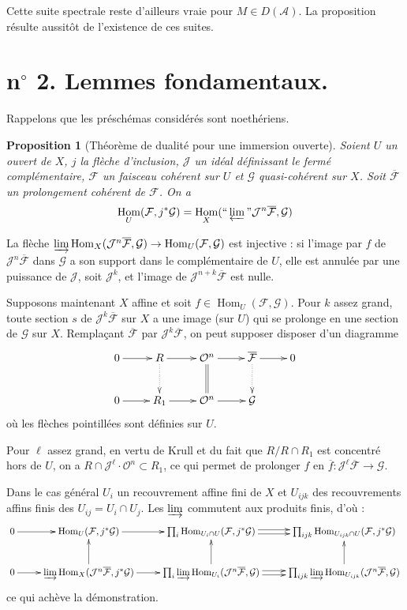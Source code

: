 \documentclass[12pt]{amsart}
\theoremstyle{plain}
\newtheorem{prop}{Proposition}[section]
\theoremstyle{definition}
\DeclareMathOperator{\Hom}{Hom}
\newcommand{\cF}{\mathcal{F}}
\newcommand{\cG}{\mathcal{G}}
\newcommand{\cJ}{\mathcal{J}}
\newcommand{\cO}{\mathcal{O}}
\newcommand{\cA}{\mathcal{A}}
\newcommand{\cD}{D}
\begin{document}
Cette suite spectrale reste d'ailleurs vraie pour $M \in \cD(\cA)$. La proposition r\'esulte aussit\^ot de l'existence de ces suites.

\section*{n$^{\circ}$ 2. Lemmes fondamentaux.}

Rappelons que les pr\'esch\'emas consid\'er\'es sont noeth\'eriens.

\begin{prop}[Th\'eor\`eme de dualit\'e pour une immersion ouverte]
Soient $U$ un ouvert de $X$, $j$ la fl\`eche d'inclusion, $\cJ$ un id\'eal d\'efinissant le ferm\'e compl\'ementaire, $\cF$ un faisceau coh\'erent sur $U$ et $\cG$ quasi-coh\'erent sur $X$. Soit $\overline{\cF}$ un prolongement coh\'erent de $\cF$. On a
\begin{equation}
\Hom_{U}(\cF, j^{*}\cG) = \Hom_{X}(\text{``}\varprojlim\text{''} \cJ^{n}\overline{\cF}, \cG)
\end{equation}
\end{prop}

La fl\`eche $\varinjlim \Hom_{X}(\cJ^{n}\overline{\cF}, \cG) \to \Hom_{U}(\cF, \cG)$ est injective : si l'image par $f$ de $\cJ^{n}\overline{\cF}$ dans $\cG$ a son support dans le compl\'ementaire de $U$, elle est annul\'ee par une puissance de $\cJ$, soit $\cJ^{k}$, et l'image de $\cJ^{n+k}\overline{\cF}$ est nulle.

Supposons maintenant $X$ affine et soit $f \in \Hom_{U}(\cF, \cG)$. Pour $k$ assez grand, toute section $s$ de $\cJ^{k}\overline{\cF}$ sur $X$ a une image (sur $U$) qui se prolonge en une section de $\cG$ sur $X$. Rempla\c{c}ant $\overline{\cF}$ par $\cJ^{k}\overline{\cF}$, on peut supposer disposer d'un diagramme
\[
\xymatrix{
0 \ar[r] & R \ar[r] \ar@{.>}[d] & \cO^{n} \ar[r] \ar@{=}[d] & \overline{\cF} \ar[r] \ar@{.>}[d] & 0 \\
0 \ar[r] & R_{1} \ar[r] & \cO^{n} \ar[r] & \cG &
}
\]
o\`u les fl\`eches pointill\'ees sont d\'efinies sur $U$.

Pour $\ell$ assez grand, en vertu de Krull et du fait que $R/R \cap R_{1}$ est concentr\'e hors de $U$, on a $R \cap \cJ^{\ell} \cdot \cO^{n} \subset R_{1}$, ce qui permet de prolonger $f$ en $\overline{f}: \cJ^{\ell}\overline{\cF} \to \cG$.

Dans le cas g\'en\'eral $U_{i}$ un recouvrement affine fini de $X$ et $U_{ijk}$ des recouvrements affins finis des $U_{ij} = U_{i} \cap U_{j}$. Les $\varinjlim$ commutent aux produits finis, d'o\`u :
\[
\xymatrix{
0 \ar[r] & \Hom_{U}(\cF,j^{*}\cG) \ar[r] & \prod_{i} \Hom_{U_{i} \cap U}(\cF,j^{*}\cG) \ar@<.5ex>[r] \ar@<-.5ex>[r] & \prod_{ijk} \Hom_{U_{ijk} \cap U}(\cF,j^{*}\cG) \\
0 \ar[r] & \varinjlim \Hom_{X}(\cJ^{n}\overline{\cF},j^{*}\cG) \ar[r] \ar[u] & \prod_{i} \varinjlim \Hom_{U_{i}}(\cJ^{n}\overline{\cF},\cG) \ar@<.5ex>[r] \ar@<-.5ex>[r] \ar[u] & \prod_{ijk} \varinjlim \Hom_{U_{ijk}}(\cJ^{n}\overline{\cF},\cG) \ar[u]
}
\]
ce qui ach\`eve la d\'emonstration.
\end{document}
